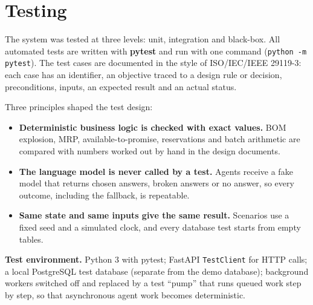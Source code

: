 
\section{Testing}

The system was tested at three levels: unit, integration and black-box. All automated tests are written with
\textbf{pytest} and run with one command (\texttt{python -m pytest}). The test cases are documented in the style of
ISO/IEC/IEEE 29119-3: each case has an identifier, an objective traced to a design rule or decision, preconditions,
inputs, an expected result and an actual status.

Three principles shaped the test design:
\begin{itemize}
  \item \textbf{Deterministic business logic is checked with exact values.} BOM explosion, MRP, available-to-promise,
        reservations and batch arithmetic are compared with numbers worked out by hand in the design documents.
  \item \textbf{The language model is never called by a test.} Agents receive a fake model that returns chosen answers,
        broken answers or no answer, so every outcome, including the fallback, is repeatable.
  \item \textbf{Same state and same inputs give the same result.} Scenarios use a fixed seed and a simulated clock,
        and every database test starts from empty tables.
\end{itemize}

\noindent\textbf{Test environment.} Python 3 with pytest; FastAPI \texttt{TestClient} for HTTP calls; a local
PostgreSQL test database (separate from the demo database); background workers switched off and replaced by a
test ``pump'' that runs queued work step by step, so that asynchronous agent work becomes deterministic.

